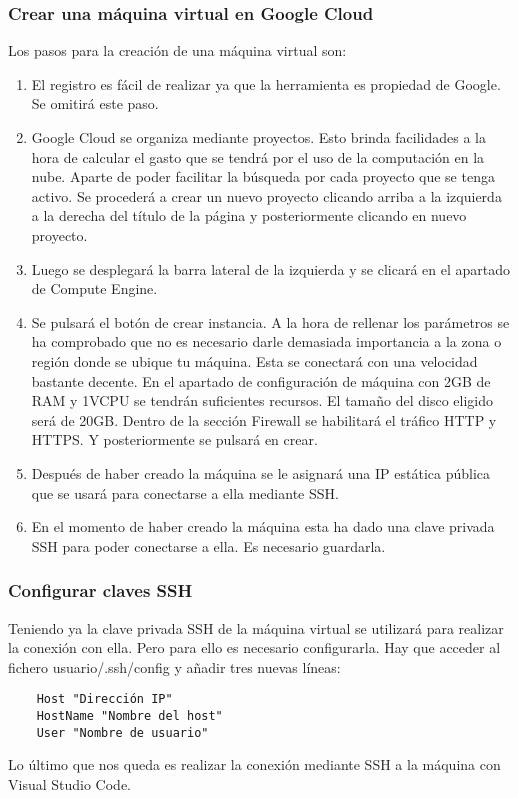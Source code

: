 \subsubsection{Crear una máquina virtual en Google Cloud}
Los pasos para la creación de una máquina virtual son:

\begin{enumerate}
    \item El registro es fácil de realizar ya que la herramienta es propiedad de Google. Se omitirá este paso.
    \item Google Cloud se organiza mediante proyectos. Esto brinda facilidades a la hora de calcular el gasto que se tendrá por el uso de la computación en la nube. Aparte de poder facilitar la búsqueda por cada proyecto que se tenga activo. Se procederá a crear un nuevo proyecto clicando arriba a la izquierda a la derecha del título de la página y posteriormente clicando en nuevo proyecto.
    \item Luego se desplegará la barra lateral de la izquierda y se clicará en el apartado de Compute Engine.
    \item Se pulsará el botón de crear instancia. A la hora de rellenar los parámetros se ha comprobado que no es necesario darle demasiada importancia a la zona o región donde se ubique tu máquina. Esta se conectará con una velocidad bastante decente. En el apartado de configuración de máquina con 2GB de RAM y 1VCPU se tendrán suficientes recursos. El tamaño del disco eligido será de 20GB. Dentro de la sección Firewall se habilitará el tráfico HTTP y HTTPS. Y posteriormente se pulsará en crear.
    \item Después de haber creado la máquina se le asignará una IP estática pública que se usará para conectarse a ella mediante SSH.
    \item En el momento de haber creado la máquina esta ha dado una clave privada SSH para poder conectarse a ella. Es necesario guardarla.
\end{enumerate}

\subsubsection{Configurar claves SSH}

Teniendo ya la clave privada SSH de la máquina virtual se utilizará para realizar la conexión con ella. Pero para ello es necesario configurarla. Hay que acceder al fichero usuario/.ssh/config y añadir tres nuevas líneas:
\begin{verbatim}
    Host "Dirección IP"
    HostName "Nombre del host"
    User "Nombre de usuario"
\end{verbatim}
Lo último que nos queda es realizar la conexión mediante SSH a la máquina con Visual Studio Code.

